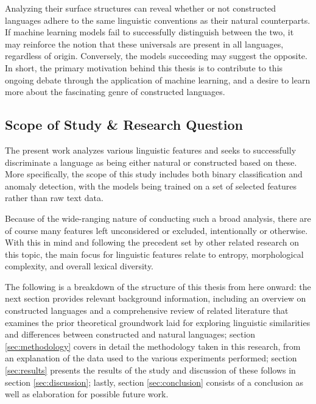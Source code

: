 \documentclass[12pt,a4paper]{article}
\numberwithin{figure}{section}
\numberwithin{table}{section}
\numberwithin{definition}{section}
\begin{document}
Analyzing their surface structures can reveal whether or not constructed languages adhere to the same linguistic conventions as their natural counterparts. If machine learning models fail to successfully distinguish between the two, it may reinforce the notion that these universals are present in all languages, regardless of origin. Conversely, the models succeeding may suggest the opposite. In short, the primary motivation behind this thesis is to contribute to this ongoing debate through the application of machine learning, and a desire to learn more about the fascinating genre of constructed languages.


\subsection{Scope of Study \& Research Question}
\label{ssec:scope}


The present work analyzes various linguistic features and seeks to successfully discriminate a language as being either natural or constructed based on these. More specifically, the scope of this study includes both binary classification and anomaly detection, with the models being trained on a set of selected features rather than raw text data. 

Because of the wide-ranging nature of conducting such a broad analysis, there are of course many features left unconsidered or excluded, intentionally or otherwise. With this in mind and following the precedent set by other related research on this topic, the main focus for linguistic features relate to entropy, morphological complexity, and overall lexical diversity.

The following is a breakdown of the structure of this thesis from here onward: the next section provides relevant background information, including an overview on constructed languages and a comprehensive review of related literature that examines the prior theoretical groundwork laid for exploring linguistic similarities and differences between constructed and natural languages; section \ref{sec:methodology} covers in detail the methodology taken in this research, from an explanation of the data used to the various experiments performed; section \ref{sec:results} presents the results of the study and discussion of these follows in section \ref{sec:discussion}; lastly, section \ref{sec:conclusion} consists of a conclusion as well as elaboration for possible future work.
\end{document}
